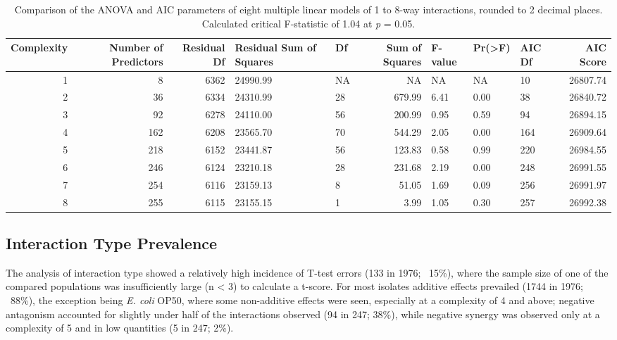 \documentclass[final,1p,times]{elsarticle}
\begin{document}
\begin{table}[H]
\centering
\scriptsize
\begin{tabular}{N N N P O N O O O N}
\toprule 
\textbf{Complexity} & \textbf{Number of Predictors} & \textbf{Residual Df} & \textbf{Residual Sum of Squares} & \textbf{Df} & \textbf{Sum of Squares} & \textbf{F-value} & \textbf{Pr(>F)} & \textbf{AIC Df} & \textbf{AIC Score} \\
\midrule
{}   1 & 8   & 6362 & 24990.99 & NA  & NA        & NA   & NA   & 10  & 26807.74 \\
                    2 & 36  & 6334 & 24310.99 & 28  & 679.99    & 6.41 & 0.00 & 38  & 26840.72 \\
   3 & 92  & 6278 & 24110.00 & 56  & 200.99    & 0.95 & 0.59 & 94  & 26894.15 \\
                    4 & 162 & 6208 & 23565.70 & 70  & 544.29    & 2.05 & 0.00 & 164 & 26909.64 \\
   5 & 218 & 6152 & 23441.87 & 56  & 123.83    & 0.58 & 0.99 & 220 & 26984.55 \\
                    6 & 246 & 6124 & 23210.18 & 28  & 231.68    & 2.19 & 0.00 & 248 & 26991.55 \\
   7 & 254 & 6116 & 23159.13 & 8   & 51.05     & 1.69 & 0.09 & 256 & 26991.97 \\
                    8 & 255 & 6115 & 23155.15 & 1   & 3.99      & 1.05 & 0.30 & 257 & 26992.38 \\     
\bottomrule
\end{tabular}
\caption{Comparison of the ANOVA and AIC parameters of eight multiple linear models of 1 to 8-way interactions, rounded to 2 decimal places. Calculated critical F-statistic of 1.04 at \textit{p} = 0.05.}
\label{tab:lmodels}
\end{table}

\newpage
\subsection{Interaction Type Prevalence}
\label{S:3:7}

The analysis of interaction type showed a relatively high incidence of T-test errors (133 in 1976; ~15\%), where the sample size of one of the compared populations was insufficiently large (n < 3) to calculate a t-score. For most isolates additive effects prevailed (1744 in 1976; ~88\%), the exception being \textit{E. coli} OP50, where some non-additive effects were seen, especially at a complexity of 4 and above; negative antagonism accounted for slightly under half of the interactions observed (94 in 247; 38\%), while negative synergy was observed only at a complexity of 5 and in low quantities (5 in 247; 2\%).
\end{document}
